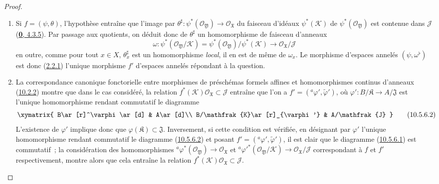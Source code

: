 \begin{proof}
\medskip\noindent
\begin{enumerate}
  \item[\rm{(i)}] Si $f=(\psi,\theta)$, l'hypothèse entraîne que
    l'image par
    $\theta^\sharp:\psi^*(\mathscr{O}_{\mathfrak{Y}})\to
    \mathscr{O}_{\mathfrak{X}}$ du faisceau d'idéaux
    $\psi^*(\mathscr{K})$ de $\psi^*(\mathscr{O}_{\mathfrak{Y}})$ est
    contenue dans $\mathscr{J}$
    (\hyperref[0.4.3.5-fr]{\textbf{0}, 4.3.5}). Par passage aux quotients, on
    déduit donc de $\theta^\sharp$ un homomorphisme de faisceau d'anneaux
    \[
      \omega:\psi^*(\mathscr{O}_{\mathfrak{Y}}/\mathscr{K})
      =\psi^*(\mathscr{O}_{\mathfrak{Y}})/\psi^*(\mathscr{K})
      \to\mathscr{O}_{\mathfrak{X}}/\mathscr{J}
    \]
    en outre, comme pour tout $x\in X$,
    $\theta_x^\sharp$ est un homomorphisme \emph{local}, il en est de
    même de $\omega_x$. Le morphisme d'espaces annelés
    $(\psi,\omega^\flat)$ est donc
    (\hyperref[I.2.2.1-fr]{2.2.1}) l'unique morphisme $f'$ d'espaces
    annelés répondant à la question.
  \item[\rm{(ii)}] La correspondance canonique fonctorielle entre
    morphismes de préschémas formels affines et homomorphismes continus
    d'anneaux (\hyperref[I.10.2.2-fr]{10.2.2}) montre que dans le cas
    considéré, la relation
    $f^*(\mathscr{K})\mathscr{O}_{\mathfrak{X}}\subset\mathscr{J}$
    entraîne que l'on a
    $f'=({}^a\varphi',\widetilde{\varphi}')$, où
    $\varphi':B/\mathfrak{K}\to A/\mathfrak{J}$ est l'unique
    homomorphisme rendant commutatif le diagramme
    \[
      \label{I.10.5.6.2-fr}
      \xymatrix{
        B\ar[r]^\varphi\ar[d] & A\ar[d]\\
        B/\mathfrak{K}\ar[r]_{\varphi'} & A/\mathfrak{J}
      }
      \tag{10.5.6.2}
    \]
    L'existence de $\varphi'$ implique donc que
    $\varphi(\mathfrak{K})\subset\mathfrak{J}$. Inversement, si cette
    condition est vérifiée, en désignant par $\varphi'$ l'unique
    homomorphisme rendant commutatif le diagramme
    (\hyperref[I.10.5.6.2-fr]{10.5.6.2}) et posant
    $f'=({}^a\varphi',\widetilde{\varphi}')$, il est clair que le
    diagramme (\hyperref[I.10.5.6.1-fr]{10.5.6.1}) est commutatif~; la
    considération des homomorphismes
    ${}^a\varphi^*(\mathscr{O}_{\mathfrak{Y}})\to
    \mathscr{O}_{\mathfrak{X}}$ et
    ${}^a{\varphi'}^*(\mathscr{O}_{\mathfrak{Y}}/\mathscr{K})\to
    \mathscr{O}_{\mathfrak{X}}/\mathscr{J}$ correspondant à $f$ et
    $f'$ respectivement, montre alors que cela entraîne la relation
    $f^*(\mathscr{K})\mathscr{O}_{\mathfrak{X}}\subset\mathscr{J}$.
\end{enumerate}
\end{proof}

